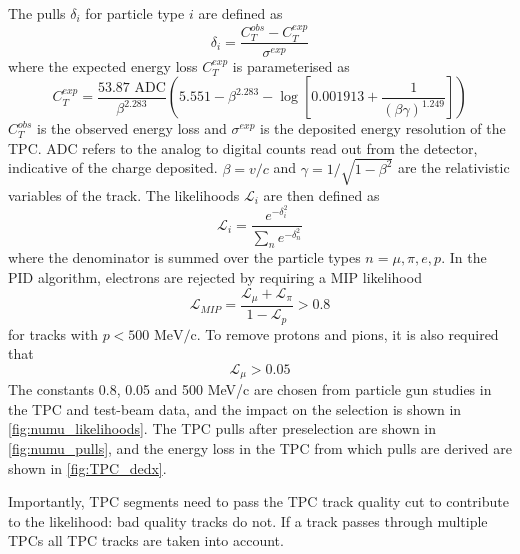 \begin{itemize}
	The pulls $\delta_i$ for particle type $i$ are defined as
	\begin{equation}
	\label{eq:tpc_track_chi2}
	\delta_i = \frac{C_T^{obs}-C_T^{exp}}{\sigma^{exp}}
	\end{equation}
	where the expected energy loss $C_T^{exp}$ is parameterised as
	\begin{equation}
	C_T^{exp} = \frac{53.87 \text{ ADC}}{\beta^{2.283}} \left( 5.551 - \beta^{2.283} - \log\left[0.001913 + \frac{1}{\left(\beta\gamma\right)^{1.249}}\right]\right)
	\end{equation}
	$C_T^{obs}$ is the observed energy loss and $\sigma^{exp}$ is the deposited energy resolution of the TPC. ADC refers to the analog to digital counts read out from the detector, indicative of the charge deposited. $\beta=v/c$ and $\gamma = 1/\sqrt{1-\beta^2}$ are the relativistic variables of the track. The likelihoods $\mathcal{L}_i$ are then defined as
	\begin{equation}
	\label{eq:tpc_track_likelihood}
		\mathcal{L}_i = \frac{e^{-\delta^2_i}}{\sum_n e^{-\delta^2_n}}
	\end{equation}
	where the denominator is summed over the particle types $n=\mu,\pi,e,p$. In the PID algorithm, electrons are rejected by requiring a MIP likelihood
	\begin{equation}
		\label{eq:tpc_track_mip}
		\mathcal{L}_{MIP} = \frac{\mathcal{L}_\mu + \mathcal{L}_\pi}{1-\mathcal{L}_p} > 0.8
	\end{equation}
	for tracks with $p<500\text{ MeV/c}$. To remove protons and pions, it is also required that
	\begin{equation}
	\label{eq:tpc_track_mu}
		\mathcal{L}_\mu > 0.05
	\end{equation}
	The constants 0.8, 0.05 and 500 MeV/c are chosen from particle gun studies in the TPC and test-beam data\cite{t2k_tpc,thesis_tpc, thesis_christine}, and the impact on the selection is shown in \autoref{fig:numu_likelihoods}. The TPC pulls after preselection are shown in \autoref{fig:numu_pulls}, and the energy loss in the TPC from which pulls are derived are shown in \autoref{fig:TPC_dedx}.
	
	Importantly, TPC segments need to pass the TPC track quality cut to contribute to the likelihood: bad quality tracks do not. If a track passes through multiple TPCs all TPC tracks are taken into account.
\end{itemize}

